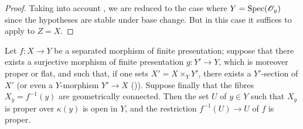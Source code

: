 \begin{proof}
Taking into account , we are reduced to the case where $Y=\operatorname{Spec}(\mathscr{O}_y)$ since the hypotheses are stable under base change.
But in this case it suffices to apply  to $Z=X$.
\end{proof}

\begin{corollary}[15.7.11]
\label{IV.15.7.11}
Let $f:X\to Y$ be a separated morphism of finite presentation; suppose that there exists a surjective morphism of finite presentation $g:Y'\to Y$, which is moreover proper or flat, and such that, if one sets $X'=X\times_Y Y'$, there exists a $Y'$-section of $X'$ (or even a $Y$-morphism $Y'\to X$ ()).
Suppose finally that the fibres $X_y=f^{-1}(y)$ are geometrically connected.
Then the set $U$ of $y\in Y$ such that $X_y$ is proper over $\kappa(y)$ is open in $Y$, and the restriction $f^{-1}(U)\to U$ of $f$ is proper.
\end{corollary}

